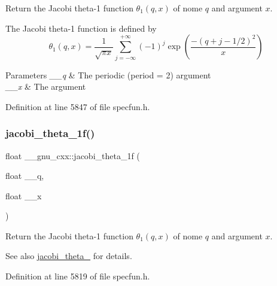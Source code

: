 Return the Jacobi theta-\/1 function $ \theta_1(q,x) $ of nome $ q $ and argument $ x $.

The Jacobi theta-\/1 function is defined by \[ \theta_1(q,x) = \frac{1}{\sqrt{\pi x}} \sum_{j=-\infty}^{+\infty} (-1)^j \exp\left( \frac{-(q + j - 1/2)^2}{x} \right) \]


\begin{DoxyParams}{Parameters}
{\em \+\_\+\+\_\+q} & The periodic (period = 2) argument \\
\hline
{\em \+\_\+\+\_\+x} & The argument \\
\hline
\end{DoxyParams}


Definition at line 5847 of file specfun.\+h.

\mbox{\label{group__gnu__math__spec__func_gacccd2107c26e39400e589a59e0af674a}} 
\subsubsection{\texorpdfstring{jacobi\+\_\+theta\+\_\+1f()}{jacobi\_theta\_1f()}}
{\footnotesize\ttfamily float \+\_\+\+\_\+gnu\+\_\+cxx\+::jacobi\+\_\+theta\+\_\+1f (\begin{DoxyParamCaption}\item[{float}]{\+\_\+\+\_\+q,  }\item[{float}]{\+\_\+\+\_\+x }\end{DoxyParamCaption})\hspace{0.3cm}{\ttfamily [inline]}}

Return the Jacobi theta-\/1 function $ \theta_1(q,x) $ of nome $ q $ and argument $ x $.

\begin{DoxySeeAlso}{See also}
\hyperlink{group__gnu__math__spec__func_ga996ca8c1fff75e2d4f196e99e0919933}{jacobi\+\_\+theta\+\_} for details. 
\end{DoxySeeAlso}


Definition at line 5819 of file specfun.\+h.

\mbox{\label{group__gnu__math__spec__func_ga823eba555ecac89556a0f4c1e62dbc5a}} 
